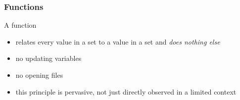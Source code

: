 \begin{frame}
\frametitle{Functions}
\begin{block}{A function}
\begin{itemize}
  \item relates every value in a set to a value in a set and \emph{does nothing else}
  \item no updating variables
  \item no opening files
  \item this principle is pervasive, not just directly observed in a limited context
\end{itemize}
\end{block}
\end{frame}
